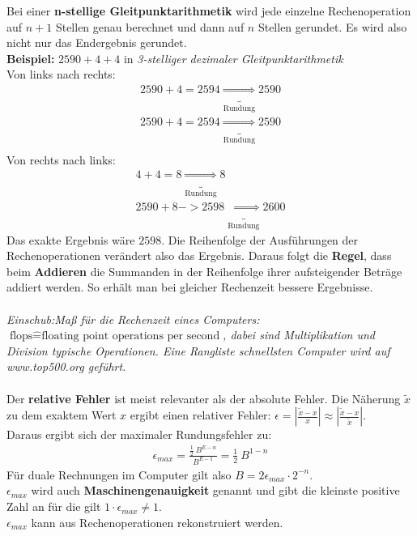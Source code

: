 \documentclass{scrartcl}
\begin{document}
Bei einer \textbf{n-stellige Gleitpunktarithmetik}
wird jede einzelne Rechenoperation auf $n+1$ Stellen genau berechnet und dann auf $n$ Stellen gerundet. Es wird also nicht nur das Endergebnis gerundet.\\
\textbf{Beispiel:} $2590+4+4$ in \textit{3-stelliger dezimaler Gleitpunktarithmetik}\\
Von links nach rechts:
\begin{align*}
2590+4=2594\underbrace{\Rightarrow}_\text{Rundung}2590\\
2590+4=2594\underbrace{\Rightarrow}_\text{Rundung}2590\\
\end{align*}
Von rechts nach links:
\begin{align*}
4+4=8\underbrace{\Rightarrow}_\text{Rundung}8\\
2590+8->2598\underbrace{\Rightarrow}_\text{Rundung}2600
\end{align*}
Das exakte Ergebnis wäre $2598$. 
Die Reihenfolge der Ausführungen der Rechenoperationen verändert also das Ergebnis.
Daraus folgt die \textbf{Regel}, dass beim \textbf{Addieren} die Summanden in der Reihenfolge ihrer aufsteigender Beträge addiert werden.
So erhält man bei gleicher Rechenzeit bessere Ergebnisse.\\
\\
\textit{Einschub:Maß für die Rechenzeit eines Computers:\\
$\text{flops} \hat{=} \text{floating point operations per second}$, dabei sind Multiplikation und Division typische Operationen.
Eine Rangliste schnellsten Computer wird auf www.top500.org geführt.}\\
\\
Der \textbf{relative Fehler} ist meist relevanter als der absolute Fehler.
Die Näherung $\tilde{x}$ zu dem exaktem Wert $x$ ergibt einen relativer Fehler: $\epsilon = |\frac{\tilde{x}-x}{x}| \approx |\frac{\tilde{x}-x}{\tilde{x}}|$.\\
Daraus ergibt sich der maximaler Rundungsfehler zu: 
\begin{align*}
\epsilon_{max}=\frac{\frac{1}{2} \ B^{E-n}}{B^{E-1}}=\frac{1}{2} \ B^{1-n}
\end{align*}
%
Für duale Rechnungen im Computer gilt also $B=2 \epsilon_{max} \cdot 2^{-n}$.\\
$\epsilon_{max}$ wird auch \textbf{Maschinengenauigkeit} genannt und gibt die kleinste positive Zahl an für die gilt $1 \cdot \epsilon_{max} \neq 1$.\\
$\epsilon_{max}$ kann aus Rechenoperationen rekonstruiert werden.\\ 
\end{document}
